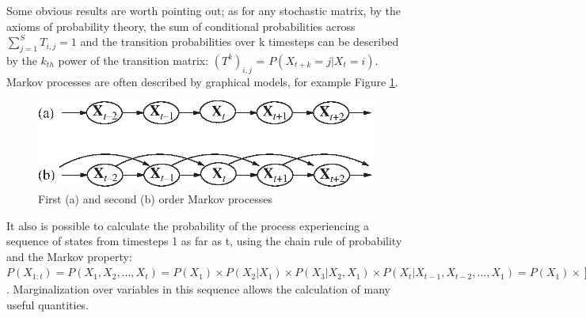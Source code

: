 Some obvious results are worth pointing out; as for any stochastic matrix, by the axioms of probability theory, the sum of conditional probabilities across {$\displaystyle \sum _{j=1}^{S}T_{i,j}=1$} and the transition probabilities over k timesteps can be described by the $k_{th}$ power of the transition matrix: ${(T^k)}_{i,j}$ = $P(X_{t+k} = j | X_{t} = i)$. Markov processes are often described by graphical models, for example Figure \ref{fig:markov-processes}.
\begin{figure}[b]
    \centering
    \includegraphics{Chapters/MultiAgentProbabilisticSearch/BayesianFiltering/Figs/markov-processes.eps}
    \caption{First (a) and second (b) order Markov processes \cite{AIAMA}}
    \label{fig:markov-processes}
\end{figure}
It also is possible to calculate the probability of the process experiencing a sequence of states from timesteps 1 as far as t, using the chain rule of probability and the Markov property:
$P(X_{1:t}) = P(X_1, X_2, ..., X_t) = P(X_1)\times P(X_2 | X_1)\times P(X_3 | X_2, X_1) \times P(X_t | X_{t-1}, X_{t-2}, ... , X_1) = P(X_1) \times \prod_{i=2}^{t}{P(X_i | x_{i-1})}$. Marginalization over variables in this sequence allows the calculation of many useful quantities.
\par

